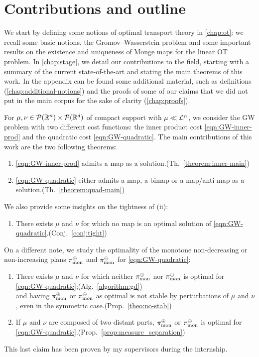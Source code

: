 \section*{Contributions and outline}
We start by defining some notions of optimal transport theory in \cref{chap:ot}: we recall some basic notions, the Gromov--Wasserstein problem and some important results on the existence and uniqueness of Monge maps for the linear OT problem. In \cref{chap:stage}, we detail our contributions to the field, starting with a summary of the current state-of-the-art and stating the main theorems of this work. In the appendix can be found some additional material, such as definitions (\cref{chap:additional-notions}) and the proofs of some of our claims that we did not put in the main corpus for the sake of clarity (\cref{chap:proofs}).

\bigskip
\noindent For $\mu, \nu\in \mathcal{P}(\mathbb{R}^n)\times\mathcal{P}(\mathbb{R}^d)$ of compact support with $\mu\ll\mathcal{L}^n$, we consider the GW problem with two different cost functions: the inner product cost \cref{eqn:GW-inner-prod} and the quadratic cost \cref{eqn:GW-quadratic}. The main contributions of this work are the two following theorems:
\begin{enumerate}[label=(\roman*), nolistsep]
\item \cref{eqn:GW-inner-prod} admits a map as a solution.\hfill(Th.~\ref{theorem:inner-main})
\item \cref{eqn:GW-quadratic} either admits a map, a bimap or a map/anti-map as a solution.\hfill(Th.~\ref{theorem:quad-main})
\end{enumerate}
We also provide some insights on the tightness of (ii):
\begin{enumerate}[label=(\roman*),start=3, nolistsep]
\item There exists $\mu$ and $\nu$ for which no map is an optimal solution of \cref{eqn:GW-quadratic}.\hfill(Conj.~\ref{conj:tight})
\end{enumerate}
\bigskip
On a different note, we study the optimality of the monotone non-decreasing or non-increasing plans $\pi_\text{mon}^\oplus$ and $\pi_\text{mon}^\ominus$ for \cref{eqn:GW-quadratic}:
\begin{enumerate}[label=(\roman*), start=4, nolistsep]
\item There exists $\mu$ and $\nu$ for which neither $\pi_\text{mon}^\oplus$ nor $\pi_\text{mon}^\ominus$ is optimal for \cref{eqn:GW-quadratic};\hfill(Alg.~\ref{algorithm:gd})\\
and having $\pi_\text{mon}^\oplus$ or $\pi_\text{mon}^\ominus$ as optimal is not stable by perturbations of $\mu$ and $\nu$, even in the symmetric case.\hfill(Prop.~\ref{theo:no-stab})
\item If $\mu$ and $\nu$ are composed of two distant parts, $\pi_\text{mon}^\oplus$ or $\pi_\text{mon}^\ominus$ is optimal for \cref{eqn:GW-quadratic}.\hfill(Prop.~\ref{prop:measure_separation})
\end{enumerate}
This last claim has been proven by my supervisors during the internship.
\bigskip

